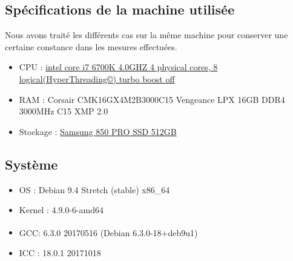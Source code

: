 \documentclass{report}
\begin{document}
  \subsection{Spécifications de la machine utilisée}
  Nous avons traité les différents cas sur la même machine pour conserver une certaine constance dans les mesures effectuées.
    \begin{itemize}
      \item CPU : \href{https://ark.intel.com/products/88195/Intel-Core-i7-6700K-Processor-8M-Cache-up-to-4_20-GHz}
        {intel core i7 6700K 4.0GHZ 4 physical cores, 8 logical(HyperThreading©) turbo boost off}
      \item RAM : Corsair CMK16GX4M2B3000C15 Vengeance LPX 16GB DDR4 3000MHz C15 XMP 2.0
      \item Stockage : \href{http://downloadcenter.samsung.com/content/UM/201711/20171115103115156/Samsung_SSD_850_PRO_Data_Sheet_Rev_3.pdf}
          {Samsung 850 PRO SSD 512GB}
    \end{itemize}
    \subsection{Système}
      \begin{itemize}
      \item OS : Debian 9.4 Stretch (stable) x86\_64
      \item Kernel :  4.9.0-6-amd64
      \item GCC\textsuperscript \textcopyleft   : 6.3.0 20170516 (Debian 6.3.0-18+deb9u1)
      \item ICC : 18.0.1 20171018
    \end{itemize}
\end{document}

